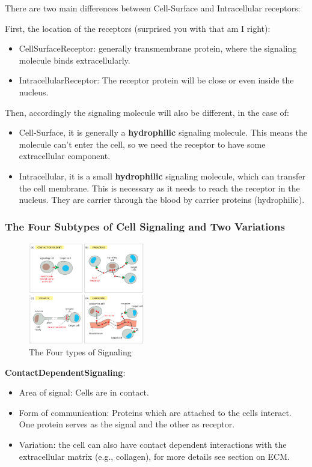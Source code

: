 \documentclass[../main.tex]{subfiles}
\begin{document}
There are two main differences between Cell-Surface and Intracellular receptors:

First, the location of the receptors (surprised you with that am I right):
\begin{itemize}
	\item \gls{CellSurfaceReceptor}: generally transmembrane protein, where the signaling molecule binds extracellularly.
	\item \gls{IntracellularReceptor}: The receptor protein will be close or even inside the nucleus.
\end{itemize}

Then, accordingly the signaling molecule will also be different, in the case of:
\begin{itemize}
	\item Cell-Surface, it is generally a \textbf{hydrophilic} signaling molecule. This means the molecule can't enter the cell, so we need the receptor to have some extracellular component.
	\item Intracellular, it is a small \textbf{hydrophilic} signaling molecule, which can transfer the cell membrane. This is necessary as it needs to reach the receptor in the nucleus. They are carrier through the blood by carrier proteins (hydrophilic).
\end{itemize}


\subsubsection{The Four Subtypes of Cell Signaling and Two Variations}

\begin{figure}[H]
	\centering
	\includegraphics[width=0.45\textwidth]{4_horsemen}
	\caption{The Four types of Signaling}
\end{figure}

\textbf{\gls{ContactDependentSignaling}}:
\begin{itemize}
	\item Area of signal: Cells are in contact.
	\item Form of communication: Proteins which are attached to the cells interact. One protein serves as the signal and the other as receptor.
	\item Variation: the cell can also have contact dependent interactions with the extracellular matrix (e.g., collagen), for more details see section on ECM.
\end{itemize}
\end{document}
